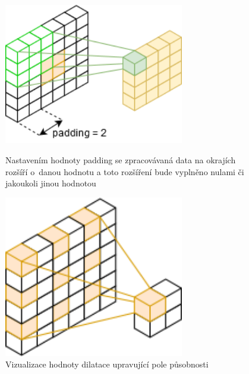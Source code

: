 \begin{figure}[H]
    \centering
    \begin{minipage}{0.45\textwidth}
        \centering
        \includegraphics[width=0.7\textwidth]{obrazky-figures/padding.png}
        \caption{\label{fig:conv_padding}Nastavením hodnoty padding se zpracovávaná data na okrajích rozšíří o~danou hodnotu a toto rozšíření bude vyplněno nulami či jakoukoli jinou hodnotou}
    \end{minipage}\hfill
    \begin{minipage}{0.45\textwidth}
        \centering
        \includegraphics[width=0.7\textwidth]{obrazky-figures/cnndilation.png}
        \caption{\label{fig:conv_dilation}Vizualizace hodnoty dilatace upravující pole působnosti}
    \end{minipage}
\end{figure}


